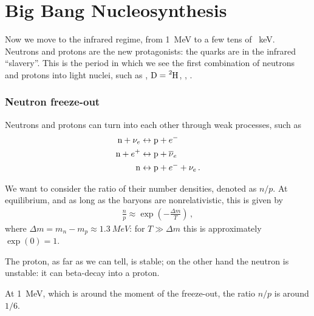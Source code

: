 \documentclass[main.tex]{subfiles}
\begin{document}
\section{Big Bang Nucleosynthesis}





Now we move to the infrared regime, from \SI{1}{MeV} to a few tens of \SI{}{keV}. 
Neutrons and protons are the new protagonists: the quarks are in the infrared ``slavery''.
This is the period in which we see the first combination of neutrons and protons into light nuclei, such as , \(\ce{D} = \ce{^{2}H}\), , .

\subsubsection{Neutron freeze-out}

Neutrons and protons can turn into each other through weak processes, such as 
%
\begin{align}
\ce{n} + \nu_{e} &\leftrightarrow \ce{p} + e^{-} \\
\ce{n} + e^{+} &\leftrightarrow \ce{p} + \overline{\nu}_{e} \\
\ce{n} &\leftrightarrow \ce{p} + e^{-} + \nu_{e}
\,.
\end{align}

We want to consider the ratio of their number densities, denoted as \(n / p\). At equilibrium, and as long as the baryons are nonrelativistic, this is given by 
%
\begin{align}
\frac{n}{p} \approx \exp(- \frac{\Delta m}{T})
\,,
\end{align}
%
where \(\Delta m = m_n - m_p \approx \SI{1.3}{MeV}\): for \(T \gg \Delta m\) this is approximately \(\exp(0) = 1\).

The proton, as far as we can tell, is stable; on the other hand the neutron is unstable: it can beta-decay into a proton. 

At \SI{1}{MeV}, which is around the moment of the freeze-out, the ratio \(n/p\) is around \(1/6\). 
\end{document}
